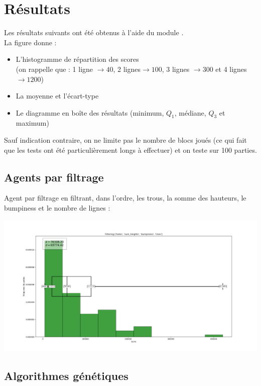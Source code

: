 \chapter{Résultats}

Les résultats suivants ont été obtenus à l'aide du module .\\
La figure donne : 
\begin{itemize}
	\item L'histogramme de répartition des scores \\
	(on rappelle que : 1 ligne  $\rightarrow 40$, 2 lignes$\rightarrow 100$, 3 lignes $\rightarrow 300$ et 4 lignes $\rightarrow 1200$)
	\item La moyenne et l'écart-type
	\item Le diagramme en boîte des résultats (minimum, $Q_1$, médiane, $Q_3$ et maximum)
\end{itemize}

Sauf indication contraire, on ne limite pas le nombre de blocs joués (ce qui fait que les tests ont été particulièrement longs à effectuer) et on teste sur 100 parties.

\section{Agents par filtrage}

Agent par filtrage en filtrant, dans l'ordre, les trous, la somme des hauteurs, le bumpiness et le nombre de lignes :

\includegraphics[scale=0.35]{media/results/Stats_Filtering_H_SH_B_L_n=100.png}

\newpage

\section{Algorithmes génétiques}

